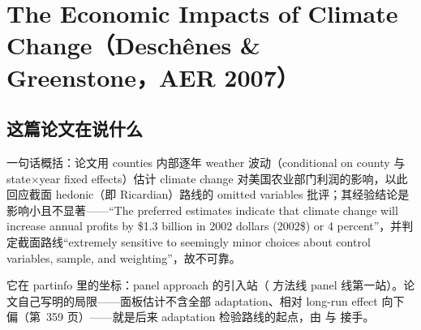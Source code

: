 
\chapter{The Economic Impacts of Climate Change（Deschênes \& Greenstone，AER 2007）}
\label{ch:deschenes-greenstone-2007}

\section{这篇论文在说什么}

一句话概括：论文用 counties 内部逐年 weather 波动（conditional on county 与 state$\times$year fixed effects）估计 climate change 对美国农业部门利润的影响，以此回应截面 hedonic（即 Ricardian）路线的 omitted variables 批评；其经验结论是影响小且不显著——``The preferred estimates indicate that climate change will increase annual profits by \$1.3 billion in 2002 dollars (2002\$) or 4 percent''\citep[第~354 页]{deschenes2007economic}，并判定截面路线``extremely sensitive to seemingly minor choices about control variables, sample, and weighting''\citep[第~354 页]{deschenes2007economic}，故不可靠。

它在 partinfo 里的坐标：panel approach 的引入站（ 方法线 panel 线第一站）。论文自己写明的局限——面板估计不含全部 adaptation、相对 long-run effect 向下偏（第~359 页）——就是后来 adaptation 检验路线的起点，由  与  接手。

